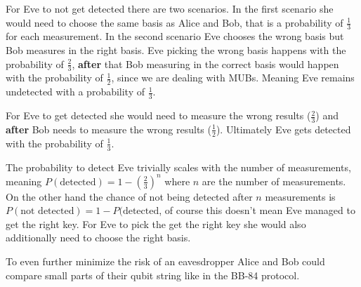 \documentclass[a4paper]{article}
\begin{document}
For Eve to not get detected there are two scenarios. In the first scenario she
would need to choose the same basis as Alice and Bob, that is a probability
of $\frac{1}{3}$ for each measurement. In the second scenario Eve
chooses the wrong basis but Bob measures in the right basis. Eve picking the
wrong basis happens with the probability of $\frac{2}{3}$, \textbf{after} that
Bob measuring in the correct basis would happen with the probability of
$\frac{1}{2}$, since we are dealing with MUBs.  Meaning Eve remains undetected
with a probability of $\frac{1}{3}$.

For Eve to get detected she would need to measure the wrong results
($\frac{2}{3}$) and \textbf{after} Bob needs to measure the wrong results
($\frac{1}{2}$). Ultimately Eve gets detected with the probability of
$\frac{1}{3}$.

The probability to detect Eve trivially scales with the number of measurements,
meaning $P(\text{detected}) = 1 - (\frac{2}{3})^n$ where $n$ are the
number of measurements. On the other hand the chance of not being detected
after $n$ measurements is $P(\text{not detected}) = 1 - P(\text{detected}$,
of course this doesn't mean Eve managed to get the right key. For Eve to pick
the get the right key she would also additionally need to choose the right
basis.

To even further minimize the risk of an eavesdropper Alice and Bob could
compare small parts of their qubit string like in the BB-84 protocol.

\nocite{teleportation}
\nocite{six-state}
\printbibliography
\end{document}

